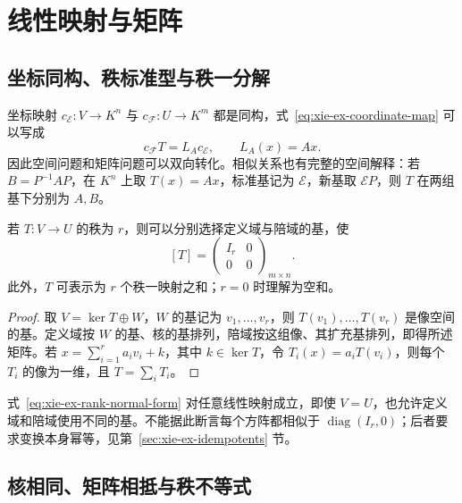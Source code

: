 \section{线性映射与矩阵}
\label{sec:xie-ex-linear-matrices}

\subsection{坐标同构、秩标准型与秩一分解}

坐标映射 $c_{\mathcal E}:V\to K^n$ 与 $c_{\mathcal F}:U\to K^m$ 都是同构，式~\eqref{eq:xie-ex-coordinate-map} 可以写成
\[
    c_{\mathcal F}T=L_Ac_{\mathcal E},\qquad L_A(x)=Ax.
\]
因此空间问题和矩阵问题可以双向转化。相似关系也有完整的空间解释：若 $B=P^{-1}AP$，在 $K^n$ 上取 $T(x)=Ax$，标准基记为 $\mathcal E$，新基取 $\mathcal E P$，则 $T$ 在两组基下分别为 $A,B$。

\begin{proposition}
\label{prop:xie-ex-rank-normal-form}
若 $T:V\to U$ 的秩为 $r$，则可以分别选择定义域与陪域的基，使
\begin{equation}
\label{eq:xie-ex-rank-normal-form}
    [T]=\begin{pmatrix}I_r&0\\0&0\end{pmatrix}_{m\times n}.
\end{equation}
此外，$T$ 可表示为 $r$ 个秩一映射之和；$r=0$ 时理解为空和。
\end{proposition}

\begin{proof}
取 $V=\ker T\oplus W$，$W$ 的基记为 $v_1,\ldots,v_r$，则 $T(v_1),\ldots,T(v_r)$ 是像空间的基。定义域按 $W$ 的基、核的基排列，陪域按这组像、其扩充基排列，即得所述矩阵。若 $x=\sum_{i=1}^{r}a_iv_i+k$，其中 $k\in\ker T$，令 $T_i(x)=a_iT(v_i)$，则每个 $T_i$ 的像为一维，且 $T=\sum_iT_i$。
\end{proof}

\begin{notealert}[type=caution,title={秩标准型使用两侧独立换基}]
式~\eqref{eq:xie-ex-rank-normal-form} 对任意线性映射成立，即使 $V=U$，也允许定义域和陪域使用不同的基。不能据此断言每个方阵都相似于 $\operatorname{diag}(I_r,0)$；后者要求变换本身幂等，见第~\ref{sec:xie-ex-idempotents} 节。
\end{notealert}

\subsection{核相同、矩阵相抵与秩不等式}

